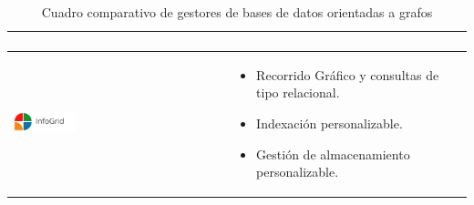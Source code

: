 \begin{table}[b!]
\begin{tabular}{|p{2cm}|ll}
{\begin{itemize}
        \cite{32}
      \end{itemize}} \\ 
        \hline
          \multicolumn{1}{|p{3cm}|}{\includegraphics[width=0.3\textwidth]{images/InfoGrid}} & 
          \multicolumn{1}{p{10cm}|}{
          \begin{itemize}
          \vspace{-10mm}
        \item Recorrido Gráfico y consultas de tipo relacional.
        \item Indexación personalizable.
        \item Gestión de almacenamiento personalizable.\cite{33}
      \end{itemize}}\\ 
         \hline
      \end{tabular}
      \caption{Cuadro comparativo de gestores de bases de datos orientadas a grafos}
      \label{table:bd orientadas a grafos}
    \end{table}

